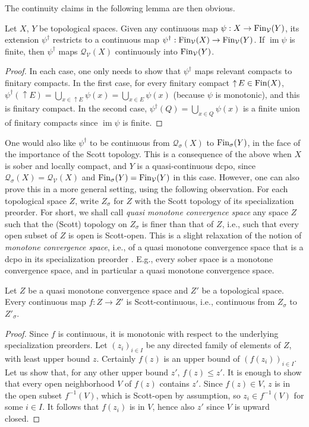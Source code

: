 \documentclass{LMCS}
\newcommand\Smyth{\mathcal Q}
\newcommand\V{{\mathcal V}}
\newcommand\SV{\Smyth_\V}
\newcommand\img{\mathop{\mathrm{im}}}
\newcommand\upc{\mathop{\uparrow}\nolimits}
\begin{document}
The continuity claims in the following lemma are then obvious.
\begin{lem}
  \label{lemma:dagger:new}
  Let $X$, $Y$ be topological spaces.  Given any continuous map $\psi
  : X \to \Fin_\V (Y)$, its extension $\psi^\dagger$ restricts to a
  continuous map $\psi^\dagger : \Fin_\V (X) \to \Fin_\V (Y)$.  If
  $\img \psi$ is finite, then $\psi^\dagger$ maps $\SV (X)$
  continuously into $\Fin_\V (Y)$.
\end{lem}
\begin{proof}
  In each case, one only needs to show that $\psi^\dagger$ maps
  relevant compacts to finitary compacts.  In the first case, for
  every finitary compact $\upc E \in \Fin (X)$, $\psi^\dagger (\upc E)
  = \bigcup_{x \in \upc E} \psi (x) = \bigcup_{x \in E} \psi (x)$
  (because $\psi$ is monotonic), and this is finitary compact.  In the
  second case, $\psi^\dagger (Q) = \bigcup_{x \in Q} \psi (x)$ is a
  finite union of finitary compacts since $\img \psi$ is finite.
\end{proof}
One would also like $\psi^\dagger$ to be continuous from
$\Smyth_\sigma (X)$ to $\mathop{\text{Fin}}_\sigma (Y)$, in the face of the
importance of the Scott topology.  This is a consequence of the above
when $X$ is sober and locally compact, and $Y$ is a quasi-continuous
dcpo, since $\Smyth_\sigma (X) = \SV (X)$ and $\Fin_\sigma (Y) =
\Fin_\V (Y)$ in this case.  However, one can also prove this in a more
general setting, using the following observation.  For each
topological space $Z$, write $Z_\sigma$ for $Z$ with the Scott
topology of its specialization preorder.  For short, we shall
call {\em quasi monotone convergence space\/} any space $Z$ such that
the (Scott) topology on $Z_\sigma$ is finer than that of $Z$, i.e.,
such that every open subset of $Z$ is open is Scott-open.  This is a
slight relaxation of the notion of {\em monotone convergence space\/},
i.e., of a quasi monotone convergence space that is a dcpo in its
specialization preorder
\cite[Definition~II-3.12]{GHKLMS:contlatt}.  E.g., every sober space
is a monotone convergence space, and in particular a quasi monotone
convergence space.
\begin{lem}
  \label{lemma:fin:cont}
  Let $Z$ be a quasi monotone convergence space and $Z'$ be a
  topological space.  Every continuous map $f : Z \to Z'$ is
  Scott-continuous, i.e., continuous from $Z_\sigma$ to $Z'_\sigma$.
\end{lem}
\begin{proof}
  Since $f$ is continuous, it is monotonic with respect to the
  underlying specialization preorders.  Let ${(z_i)}_{i \in I}$ be any
  directed family of elements of $Z$, with least upper bound $z$.
  Certainly $f (z)$ is an upper bound of ${(f (z_i))}_{i \in I}$.  Let
  us show that, for any other upper bound $z'$, $f (z) \leq z'$.  It is
  enough to show that every open neighborhood $V$ of $f (z)$ contains
  $z'$.  Since $f (z) \in V$, $z$ is in the open subset $f^{-1} (V)$,
  which is Scott-open by assumption, so $z_i \in f^{-1} (V)$ for some
  $i \in I$.  It follows that $f (z_i)$ is in $V$, hence also $z'$
  since $V$ is upward closed.
\end{proof}
\end{document}
